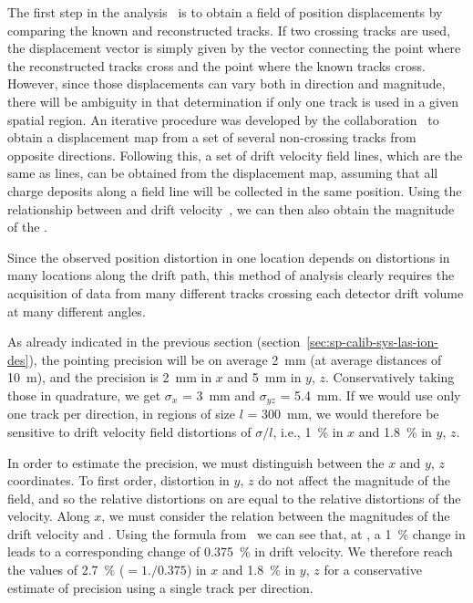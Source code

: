The first step in the analysis~\cite{bib:uBlaser2019} is to obtain a field of position displacements by comparing the known and reconstructed tracks. If two crossing tracks are used, the displacement vector is simply given by the vector connecting the point where the reconstructed tracks cross and the point where the known tracks cross. However, since those displacements can vary both in direction and magnitude, there will be ambiguity in that determination if only one track is used in a given spatial region. An iterative procedure was developed by the  collaboration~\cite{bib:chen2018,bib:uBlaser2019} to obtain a displacement map from a set of several non-crossing tracks from opposite directions. Following this, a set of drift velocity field lines, which are the same as \efield lines, can be obtained from the displacement map, assuming that all charge deposits along a field line will be collected in the same position. Using the relationship between \efield and drift velocity~\cite{Li:2015rqa,Walkowiak:2000wf}, we can then also obtain the magnitude of the \efield.

Since the observed position distortion in one location depends on \efield distortions in many locations along the drift path, this method of analysis clearly requires the acquisition of data from many different tracks crossing each detector drift volume at many different angles. 

As already indicated in the previous section (section~\ref{sec:sp-calib-sys-las-ion-des}), the pointing precision will be on average \SI{2}{\milli\m} (at average distances of \SI{10}{\m}), and the  precision is \SI{2}{\milli\m} in $x$ and \SI{5}{\milli\m} in $y$, $z$. Conservatively taking those in quadrature, we get $\sigma_x$ =  \SI{3}{\milli\m} and $\sigma_{yz}$ = \SI{5.4}{\milli\m}.
If we would use only one track per direction, in regions of size $l$ = \SI{300}{\milli\m}, we would therefore be sensitive to drift velocity field distortions of $\sigma /l$, i.e., \SI{1}{\%} in $x$ and \SI{1.8}{\%} in $y$, $z$. 

In order to estimate the \efield precision, we must distinguish between the $x$ and $y$, $z$ coordinates. To first order, distortion in $y$, $z$ do not affect the magnitude of the field, and so the relative distortions on \efield are equal to the relative distortions of the velocity. Along $x$, we must consider the relation between the magnitudes of the drift velocity and \efield. Using the formula from~\cite{Li:2015rqa,Walkowiak:2000wf} we can see that, at \spmaxfield, a \SI{1}{\%} change in \efield leads to a corresponding change of \SI{0.375}{\%} in drift velocity. We therefore reach the values of \SI{2.7}{\%} ($=1./0.375$) in $x$ and \SI{1.8}{\%} in $y$, $z$ for a conservative estimate of \efield precision using a single track per direction. 

